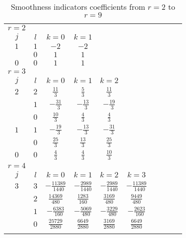 \begin{table}
  \begin{center}
    \caption{Smoothness indicators coefficients from $r=2$ to $r=9$}
    \label{tab:IS}
    \begin{tabular}{cccccccccc}
      \toprule
      $r=2$  \\
      $j$  &  $l$  &  $k=0$ &  $k=1$ \\ \addlinespace
      $1$  &  $1$  &  $-2$  &  $-2$  \\ \addlinespace
           &  $0$  &  $ 1$  &  $ 1$  \\ \addlinespace
      $0$  &  $0$  &  $ 1$  &  $ 1$  \\ \addlinespace
      \midrule
      $r=3$  \\
      $j$  &  $l$  &  $k=0$            &  $k=1$            &  $k=2$            \\ \addlinespace
      $2$  &  $2$  &  $ \frac{11}{3}$  &  $ \frac{ 5}{3}$  &  $ \frac{11}{3}$  \\ \addlinespace
           &  $1$  &  $-\frac{31}{3}$  &  $-\frac{13}{3}$  &  $-\frac{19}{3}$  \\ \addlinespace
           &  $0$  &  $ \frac{10}{3}$  &  $ \frac{ 4}{3}$  &  $ \frac{ 4}{3}$  \\ \addlinespace
      $1$  &  $1$  &  $-\frac{19}{3}$  &  $-\frac{13}{3}$  &  $-\frac{31}{3}$  \\ \addlinespace
           &  $0$  &  $ \frac{25}{3}$  &  $ \frac{13}{3}$  &  $ \frac{25}{3}$  \\ \addlinespace
      $0$  &  $0$  &  $ \frac{ 4}{3}$  &  $ \frac{ 4}{3}$  &  $ \frac{10}{3}$  \\ \addlinespace
      \midrule
      $r=4$  \\
      $j$  &  $l$  &  $k=0$                  &  $k=1$                  &  $k=2$                  &  $k=3$                  \\ \addlinespace
      $3$  &  $3$  &  $-\frac{11389}{1440}$  &  $-\frac{ 2989}{1440}$  &  $-\frac{ 2989}{1440}$  &  $-\frac{11389}{1440}$  \\ \addlinespace
           &  $2$  &  $ \frac{14369}{ 480}$  &  $ \frac{ 1283}{ 160}$  &  $ \frac{ 3169}{ 480}$  &  $ \frac{ 9449}{ 480}$  \\ \addlinespace
           &  $1$  &  $-\frac{ 6383}{ 160}$  &  $-\frac{ 5069}{ 480}$  &  $-\frac{ 3229}{ 480}$  &  $-\frac{ 2623}{ 160}$  \\ \addlinespace
           &  $0$  &  $ \frac{25729}{2880}$  &  $ \frac{ 6649}{2880}$  &  $ \frac{ 3169}{2880}$  &  $ \frac{ 6649}{2880}$  \\ \addlinespace

\end{tabular}
\end{center}
\end{table}
